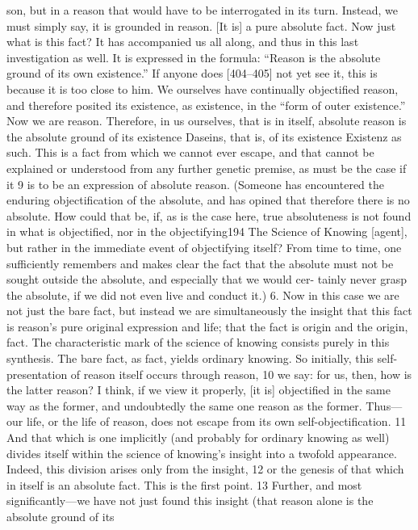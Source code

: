 son, but in a reason that would have to be interrogated in its turn. Instead, we
must simply say, it is grounded in reason. [It is] a pure absolute fact.
Now just what is this fact? It has accompanied us all along, and thus in
this last investigation as well. It is expressed in the formula: “Reason is the
absolute ground of its own existence.” If anyone does [404–405] not yet see it,
this is because it is too close to him. We ourselves have continually objectified
reason, and therefore posited its existence, as existence, in the “form of outer
existence.” Now we are reason. Therefore, in us ourselves, that is in itself,
absolute reason is the absolute ground of its existence {Daseins}, that is, of its
existence {Existenz} as such. This is a fact from which we cannot ever escape,
and that cannot be explained or understood from any further genetic premise,
as must be the case if it 9 is to be an expression of absolute reason. (Someone
has encountered the enduring objectification of the absolute, and has opined
that therefore there is no absolute. How could that be, if, as is the case here,
true absoluteness is not found in what is objectified, nor in the objectifying194
The Science of Knowing
[agent], but rather in the immediate event of objectifying itself? From time to
time, one sufficiently remembers and makes clear the fact that the absolute
must not be sought outside the absolute, and especially that we would cer-
tainly never grasp the absolute, if we did not even live and conduct it.)
6. Now in this case we are not just the bare fact, but instead we are
simultaneously the insight that this fact is reason’s pure original expression
and life; that the fact is origin and the origin, fact. The characteristic mark of
the science of knowing consists purely in this synthesis. The bare fact, as fact,
yields ordinary knowing. So initially, this self-presentation of reason itself
occurs through reason, 10 we say: for us, then, how is the latter reason? I think,
if we view it properly, [it is] objectified in the same way as the former, and
undoubtedly the same one reason as the former. Thus—our life, or the life of
reason, does not escape from its own self-objectification. 11 And that which is
one implicitly (and probably for ordinary knowing as well) divides itself
within the science of knowing’s insight into a twofold appearance. Indeed, this
division arises only from the insight, 12 or the genesis of that which in itself is
an absolute fact. This is the first point. 13 Further, and most significantly—we
have not just found this insight (that reason alone is the absolute ground of its
